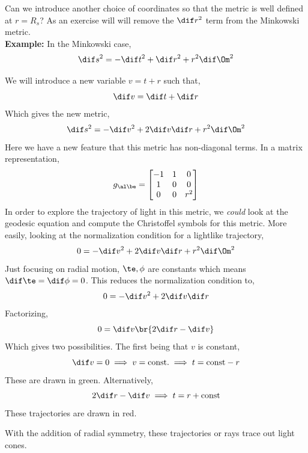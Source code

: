 \documentclass{article}
\newcommand{\mtrx}[1]{
    \begin{bmatrix}
    #1
    \end{bmatrix}
}
\begin{document}
Can we introduce another choice of coordinates so that the metric is well defined at $r = R_s$? As an exercise will will remove the $\dif r^2$ term from the Minkowski metric. \\

\textbf{Example:} In the Minkowski case,
\[ \dif s^2 = - \dif t^2 + \dif r^2 + r^2 \dif \Om^2 \]

We will introduce a new variable $v = t + r$ such that,
\[ \dif v = \dif t + \dif r \]
Which gives the new metric,
\[ \dif s^2 = - \dif v^2 + 2 \dif v \dif r + r^2 \dif \Om^2 \]
Here we have a new feature that this metric has non-diagonal terms. In a matrix representation,
\[ g_{\al\be} = \mtrx{-1 & 1 & 0 \\1 & 0 & 0 \\0 & 0 & r^2} \]
In order to explore the trajectory of light in this metric, we \textit{could} look at the geodesic equation and compute the Christoffel symbols for this metric. More easily, looking at the normalization condition for a lightlike trajectory,
\[ 0 = - \dif v^2 + 2 \dif v \dif r + r^2 \dif \Om^2 \]
Just focusing on radial motion, $\te, \phi$ are constants which means $\dif \te = \dif \phi = 0$. This reduces the normalization condition to,
\[ 0 = - \dif v^2 + 2 \dif v \dif r \]
Factorizing,
\[ 0 = \dif v \br{2 \dif r - \dif v} \]
Which gives two possibilities. The first being that $v$ is constant,
\[ \dif v = 0 \implies v = \text{const.} \implies t = \text{const} - r \]
These are drawn in green. Alternatively,
\[ 2 \dif r - \dif v \implies t = r + \text{const} \]
These trajectories are drawn in red.

\begin{center}
\end{center}
With the addition of radial symmetry, these trajectories or rays trace out light cones. \\
\end{document}
